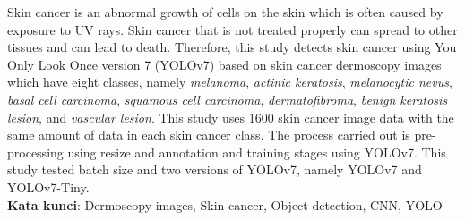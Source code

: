 \documentclass[]{mathuinsa}
\begin{document}
    
    \begin{abstracteng}
        Skin cancer is an abnormal growth of cells on the skin which is often caused by exposure to UV rays. Skin cancer that is not treated properly can spread to other tissues and can lead to death. Therefore, this study detects skin cancer using You Only Look Once version 7 (YOLOv7) based on skin cancer dermoscopy images which have eight classes, namely \textit{melanoma}, \textit{actinic keratosis}, \textit{melanocytic nevus}, \textit{basal cell carcinoma}, \textit{squamous cell carcinoma}, \textit{dermatofibroma}, \textit{benign keratosis lesion}, and \textit{vascular lesion}. This study uses 1600 skin cancer image data with the same amount of data in each skin cancer class. The process carried out is pre-processing using resize and annotation and training stages using YOLOv7. This study tested batch size and two versions of YOLOv7, namely YOLOv7 and YOLOv7-Tiny.\\
        \noindent
        \textbf{Kata kunci}: Dermoscopy images, Skin cancer, Object detection, CNN, YOLO
    \end{abstracteng}

    
    
    
    
    


    


    \appendix
    \label{appendix: filter}
\end{document}
